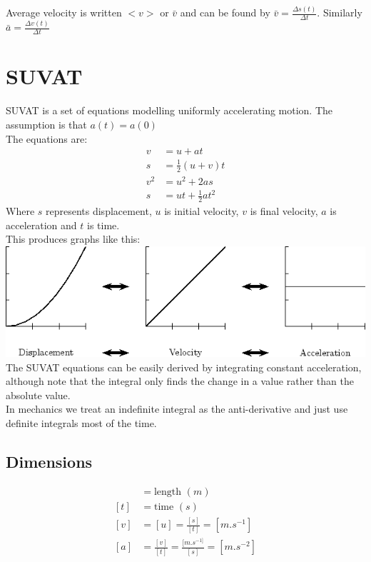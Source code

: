 \documentclass[a4paper,12pt]{article}
\begin{document}
Average velocity is written $<v>$ or $\bar{v}$ and can be found by $\bar{v} = \frac{\Delta s(t)}{\Delta t}$. Similarly $\bar{a} = \frac{\Delta v(t)}{\Delta t}$ \\

\section*{SUVAT}
SUVAT is a set of equations modelling uniformly accelerating motion. The assumption is that $a(t) = a(0)$\\
The equations are:
\begin{align}
v & = u + at \\
s & = \frac{1}{2}(u + v)t \\
v^2 & = u^2 + 2as \\
s & = ut + \frac{1}{2}at^2 
\end{align}
Where $s$ represents displacement, $u$ is initial velocity, $v$ is final velocity, $a$ is acceleration and $t$ is time. \\
This produces graphs like this: \\
\includegraphics[scale=0.5]{Graphs2} \\
The SUVAT equations can be easily derived by integrating constant acceleration, although note that the integral only finds the change in a value rather than the absolute value. \\
In mechanics we treat an indefinite integral as the anti-derivative and just use definite integrals most of the time. 
\subsection*{Dimensions}
\begin{align*}
[s] & = \text{length } (m) \\
[t] & = \text{time } (s) \\
[v] & = [u] = \frac{[s]}{[t]} = [m.s^{-1}] \\
[a] & = \frac{[v]}{[t]} = \frac{[m.s^{-1]}}{[s]} = [m.s^{-2}] \\ 
\end{align*}
\end{document}

